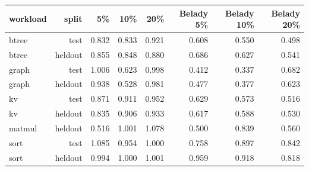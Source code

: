 \begin{tabular}{lrrrrrrr}
\toprule
workload & split & 5\% & 10\% & 20\% & Belady 5\% & Belady 10\% & Belady 20\% \\
\midrule
btree & test & 0.832 & 0.833 & 0.921 & 0.608 & 0.550 & 0.498 \\
btree & heldout & 0.855 & 0.848 & 0.880 & 0.686 & 0.627 & 0.541 \\
graph & test & 1.006 & 0.623 & 0.998 & 0.412 & 0.337 & 0.682 \\
graph & heldout & 0.938 & 0.528 & 0.981 & 0.477 & 0.377 & 0.623 \\
kv & test & 0.871 & 0.911 & 0.952 & 0.629 & 0.573 & 0.516 \\
kv & heldout & 0.835 & 0.906 & 0.933 & 0.617 & 0.588 & 0.530 \\
matmul & heldout & 0.516 & 1.001 & 1.078 & 0.500 & 0.839 & 0.560 \\
sort & test & 1.085 & 0.954 & 1.000 & 0.758 & 0.897 & 0.842 \\
sort & heldout & 0.994 & 1.000 & 1.001 & 0.959 & 0.918 & 0.818 \\
\bottomrule
\end{tabular}
